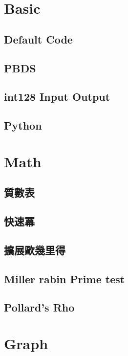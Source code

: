 \section{Basic}
\subsection{Default Code}

\subsection{PBDS}

\subsection{int128 Input Output}

\subsection{Python}


\section{Math}
\subsection{質數表} 

\subsection{快速冪} 

\subsection{擴展歐幾里得} 

\subsection{Miller rabin Prime test} 

\subsection{Pollard's Rho} 


\section{Graph}

